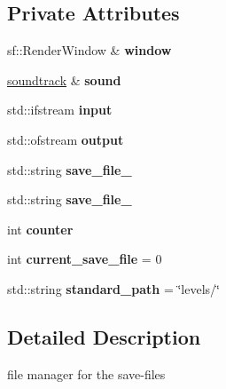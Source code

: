 \subsection*{Private Attributes}
\begin{DoxyCompactItemize}
\item 
\mbox{\label{classfile__management_ae918c94705d91703f7305439f34e07f8}} 
sf\+::\+Render\+Window \& {\bfseries window}
\item 
\mbox{\label{classfile__management_ae7074fbc5ae0481d0d94c33c4e5890e4}} 
\hyperlink{classsoundtrack}{soundtrack} \& {\bfseries sound}
\item 
\mbox{\label{classfile__management_aa5b855928609e6725e9912d4d5113455}} 
std\+::ifstream {\bfseries input}
\item 
\mbox{\label{classfile__management_af8152191fda966b0f308a33f530278da}} 
std\+::ofstream {\bfseries output}
\item 
\mbox{\label{classfile__management_a503b8f617941c7bcce5fd6d1898fceae}} 
std\+::string {\bfseries save\+\_\+file\+\_}
\item 
\mbox{\label{classfile__management_aa5040a08dff914b113025893ef56ad45}} 
std\+::string {\bfseries save\+\_\+file\+\_}
\item 
\mbox{\label{classfile__management_a93097112df7cf7b9783004c8c8ce19eb}} 
int {\bfseries counter}
\item 
\mbox{\label{classfile__management_a3089e02713d9608fa342ea5673a88845}} 
int {\bfseries current\+\_\+save\+\_\+file} = 0
\item 
\mbox{\label{classfile__management_ab08321ef015c6e8843b4632b3ae9c463}} 
std\+::string {\bfseries standard\+\_\+path} = \char`\"{}levels/\char`\"{}
\end{DoxyCompactItemize}


\subsection{Detailed Description}
file manager for the save-\/files 

